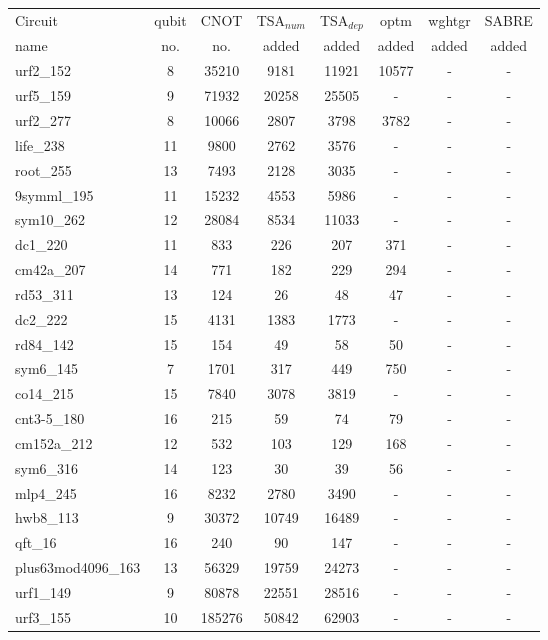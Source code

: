 \documentclass[runningheads]{llncs}
\begin{document}
		\begin{table}[!ht]
			\begin{center}  
				\begin{tabular}{|p{4.3cm}<{\centering}|c|c|c|c|c|c|c|}
					\hline
					Circuit &  qubit  & CNOT &TSA$_{num}$& TSA$_{dep}$  & optm 	 & wghtgr  &SABRE 	\\
					 name	&   no. 	&	no. & added&  added &  added 	&  added&  added\\
					\hline
					urf2\_152 & 8 & 35210 & 9181 & 11921 & 10577 & -& - \\
					urf5\_159 & 9 & 71932 & 20258 & 25505 & - & -& - \\
					urf2\_277 & 8 & 10066 & 2807 & 3798 & 3782 & -& - \\
					life\_238 & 11 & 9800 & 2762 & 3576 & - & -& - \\
					root\_255 & 13 & 7493 & 2128 & 3035 & - & -& - \\
					9symml\_195 & 11 & 15232 & 4553 & 5986 & - & -& - \\
					sym10\_262 & 12 & 28084 & 8534 & 11033 & - & -& - \\
					dc1\_220 & 11 & 833 & 226 & 207 & 371 & -& - \\
					cm42a\_207 & 14 & 771 & 182 & 229 & 294 & -& - \\
					rd53\_311 & 13 & 124 & 26 & 48 & 47 & -& - \\
					dc2\_222 & 15 & 4131 & 1383 & 1773 & - & -& - \\
					rd84\_142 & 15 & 154 & 49 & 58 & 50 & -& - \\
					sym6\_145 & 7 & 1701 & 317 & 449 & 750 & -& - \\
					co14\_215 & 15 & 7840 & 3078 & 3819 & - & -& - \\
					cnt3-5\_180 & 16 & 215 & 59 & 74 & 79 & -& - \\
					cm152a\_212 & 12 & 532 & 103 & 129 & 168 & -& - \\
					sym6\_316 & 14 & 123 & 30 & 39 & 56 & -& - \\
					mlp4\_245 & 16 & 8232 & 2780 & 3490 & - & -& - \\
hwb8\_113 & 9 & 30372 & 10749 & 16489 & - & -& - \\
qft\_16 & 16 & 240 & 90 & 147 & - & -& - \\
plus63mod4096\_163 & 13 & 56329 & 19759 & 24273 & - & -& - \\
urf1\_149 & 9 & 80878 & 22551 & 28516 & - & -& - \\
urf3\_155 & 10 & 185276 & 50842 & 62903 & - & -& - \\

\end{tabular}
\end{center}
\end{table}
\end{document}
